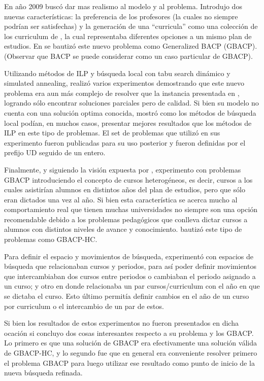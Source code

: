 \documentclass[letter, 10pt]{article}
\begin{document}
En año 2009 \cite{chiarandini2012balanced} buscó dar mas realismo al modelo y al
problema. Introdujo dos nuevas características: la preferencia de los profesores
(la cuales no siempre podrían ser satisfechas) y la generación de una
``curricula'' como una colección de los curriculum de \cite{castro2001variable},
la cual representaba diferentes opciones a un mismo plan de estudios. En
\cite{chiarandini2012balanced} se bautizó este nuevo problema como Generalized
BACP (GBACP). (Observar que BACP se puede considerar como un caso particular de
GBACP).

Utilizando métodos de ILP y búsqueda local con tabu search dinámico y
simulated annealing, realizó varios experimentos demostrando que este
nuevo problema era aun más complejo de resolver que la instancia
presentada en \cite{castro2001variable}, logrando sólo encontrar
soluciones parciales pero de calidad. Si bien su modelo no cuenta con
una solución optima conocida, mostró como los métodos de búsqueda local
podían, en muchos casos, presentar mejores resultados que los métodos de
ILP en este tipo de problemas. El set de problemas que utilizó en sus
experimento fueron publicadas para su uso posterior y fueron definidas
por el prefijo UD seguido de un entero.

Finalmente, y siguiendo la visión expuesta por \cite{chiarandini2012balanced},
\cite{schaerfmodelling} experimento con problemas GBACP introduciendo el
concepto de cursos heterogéneos, es decir, cursos a los cuales asistirían
alumnos en distintos años del plan de estudios, pero que sólo eran dictados una
vez al año. Si bien esta característica se acerca mucho al comportamiento real
que tienen muchas universidades no siempre son una opción recomendable debido a
los problemas pedagógicos que conlleva dictar cursos a alumnos con distintos
niveles de avance y conocimiento. \cite{schaerfmodelling} bautizó este tipo de
problemas como GBACP-HC.

Para definir el espacio y movimientos de búsqueda,
\cite{schaerfmodelling} experimentó con espacios de búsqueda que
relacionaban cursos y periodos, para así poder definir movimientos que
intercambiaban dos cursos entre periodos o cambiaban el periodo asignado
a un curso; y otro en donde relacionaba un par cursos/curriculum con el año
en que se dictaba el curso. Esto último permitía definir cambios en el
año de un curso por curriculum o el intercambio de un par de estos.

Si bien los resultados de estos experimentos no fueron presentados en dicha
ocación si concluyo dos cosas interesantes respecto a su problema y los
GBACP. Lo primero es que una solución de GBACP era efectivamente una solución
válida de GBACP-HC, y lo segundo fue que en general era conveniente resolver
primero el problema GBACP para luego utilizar ese resultado como punto de inicio
de la nueva búsqueda refinada.
\end{document}
